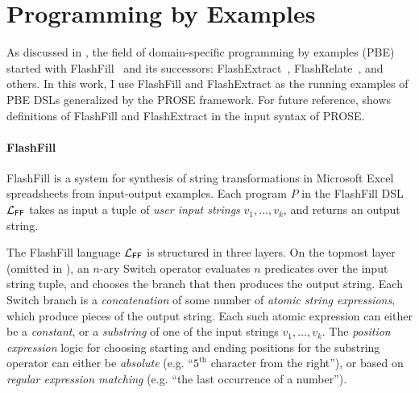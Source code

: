 \section{Programming by Examples}
\label{sec:background:pbe}

As discussed in , the field of domain-specific programming by examples (PBE) started with
FlashFill~\cite{flashfill} and its successors: FlashExtract~\cite{flashextract}, FlashRelate~\cite{flashrelate}, and
others.
In this work, I use FlashFill and FlashExtract as the running examples of PBE DSLs generalized by the PROSE framework.
For future reference,  shows definitions of FlashFill and FlashExtract in the input syntax of
PROSE.

\paragraph{FlashFill}
FlashFill is a system for synthesis of string transformations in Microsoft Excel spreadsheets from input-output
examples.
Each program $P$ in the FlashFill DSL $\mathcal{L}_{\mathsf{FF}}$ takes as input a tuple of \emph{user input strings} $v_1, \dots, v_k$,
and returns an output string.

The FlashFill language $\mathcal{L}_{\mathsf{FF}}$ is structured in three layers.
On the topmost layer (omitted in ), an $n$-ary
\textsf{Switch} operator evaluates $n$ predicates over the input string tuple, and chooses the branch that then produces
the output string.
Each \textsf{Switch} branch is a \emph{concatenation} of some number of \emph{atomic string expressions}, which
produce pieces of the output string.
Each such atomic expression can either be a \emph{constant}, or a \emph{substring} of one of the input strings $v_1,
\dots, v_k$.
The \emph{position expression} logic for choosing starting and ending positions for the substring operator can either be
\emph{absolute} (e.g.  ``$5^{\text{th}}$ character from the right''), or based on \emph{regular expression matching}
(e.g. ``the last occurrence of a number'').

